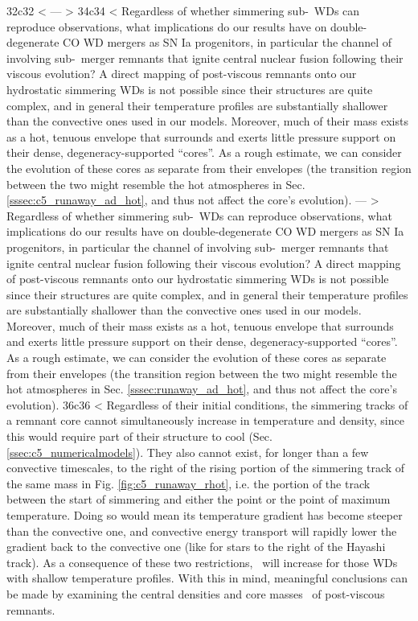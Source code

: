 32c32
< \label{ssec:c5_implications}
---
> \label{ssec:implications}
34c34
< Regardless of whether simmering sub-\Mch\ WDs can reproduce observations, what implications do our results have on double-degenerate CO WD mergers as SN Ia progenitors, in particular the channel of \citeal{vkercj10} involving sub-\Mch\ merger remnants that ignite central nuclear fusion following their viscous evolution?  A direct mapping of post-viscous remnants onto our hydrostatic simmering WDs is not possible since their structures are quite complex, and in general their temperature profiles are substantially shallower than the convective ones used in our models.  Moreover, much of their mass exists as a hot, tenuous envelope that surrounds and exerts little pressure support on their dense, degeneracy-supported ``cores''.  As a rough estimate, we can consider the evolution of these cores as separate from their envelopes (the transition region between the two might resemble the hot atmospheres in Sec. \ref{sssec:c5_runaway_ad_hot}, and thus not affect the core's evolution).
---
> Regardless of whether simmering sub-\Mch\ WDs can reproduce observations, what implications do our results have on double-degenerate CO WD mergers as SN Ia progenitors, in particular the channel of \citeal{vkercj10} involving sub-\Mch\ merger remnants that ignite central nuclear fusion following their viscous evolution?  A direct mapping of post-viscous remnants onto our hydrostatic simmering WDs is not possible since their structures are quite complex, and in general their temperature profiles are substantially shallower than the convective ones used in our models.  Moreover, much of their mass exists as a hot, tenuous envelope that surrounds and exerts little pressure support on their dense, degeneracy-supported ``cores''.  As a rough estimate, we can consider the evolution of these cores as separate from their envelopes (the transition region between the two might resemble the hot atmospheres in Sec. \ref{sssec:runaway_ad_hot}, and thus not affect the core's evolution).
36c36
< Regardless of their initial conditions, the simmering tracks of a remnant core cannot simultaneously increase in temperature and density, since this would require part of their structure to cool (Sec. \ref{ssec:c5_numericalmodels}).  They also cannot exist, for longer than a few convective timescales, to the right of the rising portion of the simmering track of the same mass in Fig. \ref{fig:c5_runaway_rhot}, i.e. the portion of the track between the start of simmering and either the \citeal{wooswk04} point or the point of maximum temperature.  Doing so would mean its temperature gradient has become steeper than the convective one, and convective energy transport will rapidly lower the gradient back to the convective one (like for stars to the right of the Hayashi track).  As a consequence of these two restrictions, \Mcrit\ will increase for those WDs with shallow temperature profiles.  With this in mind, meaningful conclusions can be made by examining the central densities and core masses \Mc\ of post-viscous remnants.
